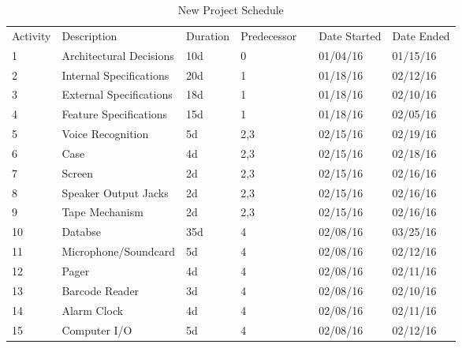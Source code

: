 \documentclass{article}
\begin{document}
\begin{table}[H]
\centering
\caption{New Project Schedule}
\label{my-label}
\begin{tabular}{lllllll}
Activity & Description                   & Duration & Predecessor                 &  & Date Started & Date Ended \\
1        & Architectural Decisions       & 10d      & 0                           &  & 01/04/16     & 01/15/16   \\
2        & Internal Specifications       & 20d      & 1                           &  & 01/18/16     & 02/12/16   \\
3        & External Specifications       & 18d      & 1                           &  & 01/18/16     & 02/10/16   \\
4        & Feature Specifications        & 15d      & 1                           &  & 01/18/16     & 02/05/16   \\
5        & Voice Recognition             & 5d       & 2,3                         &  & 02/15/16     & 02/19/16   \\
6        & Case                          & 4d       & 2,3                         &  & 02/15/16     & 02/18/16   \\
7        & Screen                        & 2d       & 2,3                         &  & 02/15/16     & 02/16/16   \\
8        & Speaker Output Jacks          & 2d       & 2,3                         &  & 02/15/16     & 02/16/16   \\
9        & Tape Mechanism                & 2d       & 2,3                         &  & 02/15/16     & 02/16/16   \\
10       & Databse                       & 35d      & 4                           &  & 02/08/16     & 03/25/16   \\
11       & Microphone/Soundcard          & 5d       & 4                           &  & 02/08/16     & 02/12/16   \\
12       & Pager                         & 4d       & 4                           &  & 02/08/16     & 02/11/16   \\
13       & Barcode Reader                & 3d       & 4                           &  & 02/08/16     & 02/10/16   \\
14       & Alarm Clock                   & 4d       & 4                           &  & 02/08/16     & 02/11/16   \\
15       & Computer I/O                  & 5d       & 4                           &  & 02/08/16     & 02/12/16   \\

\end{tabular}
\end{table}
\end{document}
